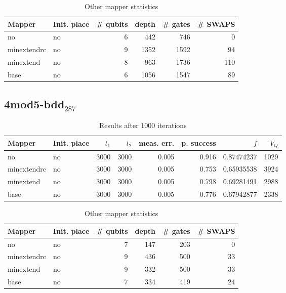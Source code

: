 \documentclass[11pt]{article}
\begin{document}
\begin{table}[!htpb]
\caption{\label{tab:org49fb5ce}
Other mapper statistics}
\centering
\small
\begin{tabular}{llrrrr}
\hline
Mapper & Init. place & \# qubits & depth & \# gates & \# SWAPS\\
\hline
no & no & 6 & 442 & 746 & 0\\
\hline
minextendrc & no & 9 & 1352 & 1592 & 94\\
minextend & no & 8 & 963 & 1736 & 110\\
base & no & 6 & 1056 & 1547 & 89\\
\hline
\end{tabular}
\end{table}

\subsection{4mod5-bdd\(_{\text{287}}\)}
\label{sec:org174cc32}
\begin{table}[!htpb]
\caption{\label{tab:org3392910}
Results after 1000 iterations}
\centering
\begin{tabular}{llrrrrrr}
\hline
Mapper & Init. place & \(t_1\) & \(t_2\) & meas. err. & p. success & \(f\) & \(V_Q\)\\
\hline
no & no & 3000 & 3000 & 0.005 & 0.916 & 0.87474237 & 1029\\
\hline
minextendrc & no & 3000 & 3000 & 0.005 & 0.753 & 0.65935538 & 3924\\
minextend & no & 3000 & 3000 & 0.005 & 0.798 & 0.69281491 & 2988\\
base & no & 3000 & 3000 & 0.005 & 0.776 & 0.67942877 & 2338\\
\hline
\end{tabular}
\end{table}


\begin{table}[!htpb]
\caption{\label{tab:org767f4ce}
Other mapper statistics}
\centering
\small
\begin{tabular}{llrrrr}
\hline
Mapper & Init. place & \# qubits & depth & \# gates & \# SWAPS\\
\hline
no & no & 7 & 147 & 203 & 0\\
\hline
minextendrc & no & 9 & 436 & 500 & 33\\
minextend & no & 9 & 332 & 500 & 33\\
base & no & 7 & 334 & 419 & 24\\
\hline
\end{tabular}
\end{table}
\end{document}
